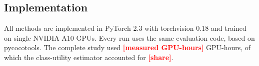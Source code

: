 \documentclass[conference]{IEEEtran}
\newcommand{\todo}[1]{\textcolor{red}{\textbf{[#1]}}}
\begin{document}
\subsection{Implementation}
\label{sec:setup_impl}

All methods are implemented in PyTorch 2.3 with torchvision 0.18 and trained on single NVIDIA A10 GPUs. Every run uses the same evaluation code, based on pycocotools. The complete study used \todo{measured GPU-hours} GPU-hours, of which the class-utility estimator accounted for \todo{share}.




\end{document}
